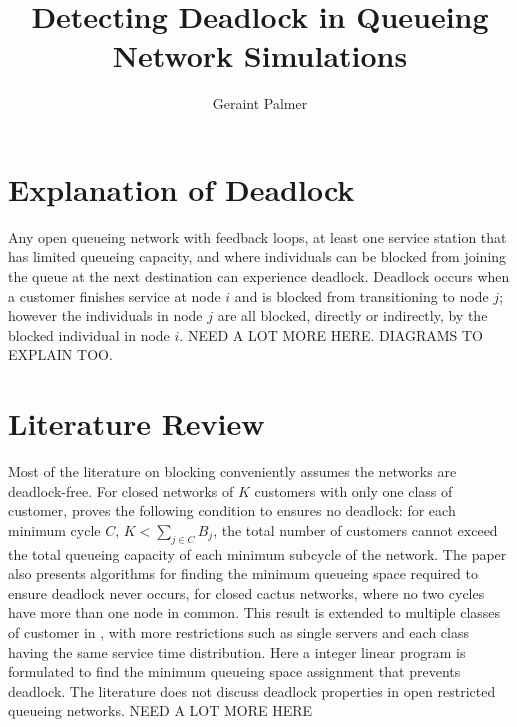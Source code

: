 \documentclass{article}
\title{Detecting Deadlock in Queueing Network Simulations}
\author{Geraint Palmer}
\date{}
\begin{document}
\onehalfspacing

\maketitle

\section{Explanation of Deadlock}
Any open queueing network with feedback loops, at least one service station that has limited queueing capacity, and where individuals can be blocked from joining the queue at the next destination can experience deadlock. Deadlock occurs when a customer finishes service at node $i$ and is blocked from transitioning to node $j$; however the individuals in node $j$ are all blocked, directly or indirectly, by the blocked individual in node $i$.
NEED A LOT MORE HERE. DIAGRAMS TO EXPLAIN TOO.

\section{Literature Review}
Most of the literature on blocking conveniently assumes the networks are deadlock-free. For closed networks of $K$ customers with only one class of customer, \cite{kunduakyildiz89} proves the following condition to ensures no deadlock: for each minimum cycle $C$, $K < \sum_{j\in C} B_j$, the total number of customers cannot exceed the total queueing capacity of each minimum subcycle of the network. The paper also presents algorithms for finding the minimum queueing space required to ensure deadlock never occurs, for closed cactus networks, where no two cycles have more than one node in common. This result is extended to multiple classes of customer in \cite{liebeherrakyildiz95}, with more restrictions such as single servers and each class having the same service time distribution. Here a integer linear program is formulated to find the minimum queueing space assignment that prevents deadlock. The literature does not discuss deadlock properties in open restricted queueing networks.\newline
NEED A LOT MORE HERE
\end{document}
